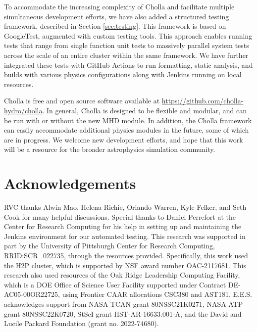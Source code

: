 \documentclass[modern]{aastex631}
\begin{document}
To accommodate the increasing complexity of Cholla and facilitate multiple simultaneous development efforts, we have also added a structured testing framework, described in Section \ref{sec:testing}. This framework is based on GoogleTest, augmented with custom testing tools. This approach enables running tests that range from single function unit tests to massively parallel system tests across the scale of an entire cluster within the same framework. We have further integrated these tests with GitHub Actions to run formatting, static analysis, and builds with various physics configurations along with Jenkins running on local resources.

Cholla is free and open source software available at \url{https://github.com/cholla-hydro/cholla}. In general, Cholla is designed to be flexible and modular, and can be run with or without the new MHD module. In addition, the Cholla framework can easily accommodate additional physics modules in the future, some of which are in progress. We welcome new development efforts, and hope that this work will be a resource for the broader astrophysics simulation community.


\section{Acknowledgements}

RVC thanks Alwin Mao, Helena Richie, Orlando Warren, Kyle Felker, and Seth Cook for many helpful discussions. Special thanks to Daniel Perrefort at the Center for Research Computing for his help in setting up and maintaining the Jenkins environment for our automated testing. This research was supported in part by the University of Pittsburgh Center for Research Computing, RRID:SCR\_022735, through the resources provided. Specifically, this work used the H2P cluster, which is supported by NSF award number OAC-2117681. This research also used resources of the Oak Ridge Leadership Computing Facility, which is a DOE Office of Science User Facility supported under Contract DE-AC05-00OR22725, using Frontier CAAR allocations CSC380 and AST181. E.E.S. acknowledges support from NASA TCAN grant 80NSSC21K0271, NASA ATP grant 80NSSC22K0720, StScI grant HST-AR-16633.001-A, and the David and Lucile Packard Foundation (grant no. 2022-74680).



\end{document}
